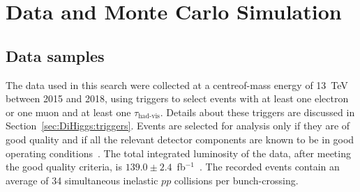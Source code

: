 \section{Data and Monte Carlo Simulation}
\subsection{Data samples}
\label{sec:DiHiggs:data}

The data used in this search were collected at a centreof-mass energy
of 13~TeV between 2015 and 2018, using triggers to 
select events with at least one electron or one muon
and at least one $\tau_\text{had-vis}$.
Details about these triggers are discussed in Section~\ref{sec:DiHiggs:triggers}.
Events are selected for analysis only if they are of good quality and
if all the relevant detector components are known to be in good operating conditions~\cite{DAPR-2018-01}.
The total integrated luminosity of the data, after meeting the good quality criteria,
is $139.0 \pm 2.4$~fb$^{-1}$~\cite{DAPR-2013-01,ATLAS-Lumi2}.
The recorded events contain an average of 34 simultaneous inelastic $pp$ collisions per bunch-crossing.

